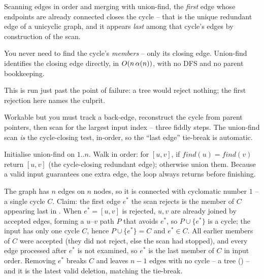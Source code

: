 \begin{observation}
Scanning edges in order and merging with union-find, the \emph{first} edge whose endpoints are
already connected closes the cycle -- that is the unique redundant edge of a unicyclic graph, and it
appears \emph{last} among that cycle's edges by construction of the scan.
\end{observation}
\begin{observation}
You never need to find the cycle's \emph{members} -- only its closing edge. Union-find identifies the
closing edge directly, in $O(n\,\alpha(n))$, with no DFS and no parent bookkeeping.
\end{observation}
\begin{observation}
This is  run just past the point of failure: a tree would reject nothing; the first
rejection here names the culprit.
\end{observation}

\begin{thinkbox}
{Workable but you must track a back-edge, reconstruct the cycle from parent pointers, then scan for
the largest input index -- three fiddly steps. The union-find scan \emph{is} the cycle-closing test,
in-order, so the ``last edge'' tie-break is automatic.}
\end{thinkbox}

Initialise union-find on $1..n$. Walk  in order: for $[u,v]$, if $\mathit{find}(u)=\mathit{find}(v)$
return $[u,v]$ (the cycle-closing redundant edge); otherwise union them. Because a valid input
guarantees one extra edge, the loop always returns before finishing.

\begin{proofbox}
The graph has $n$ edges on $n$ nodes, so it is connected with cyclomatic number $1$ -- a single
cycle $C$. Claim: the first edge $e^\ast$ the scan rejects is the member of $C$ appearing last in
. When $e^\ast=[u,v]$ is rejected, $u,v$ are already joined by accepted edges, forming a
$u$--$v$ path $P$ that avoids $e^\ast$, so $P\cup\{e^\ast\}$ is a cycle; the input has only one cycle
$C$, hence $P\cup\{e^\ast\}=C$ and $e^\ast\in C$. All earlier members of $C$ were accepted (they did
not reject, else the scan had stopped), and every edge processed after $e^\ast$ is not examined, so
$e^\ast$ is the last member of $C$ in input order. Removing $e^\ast$ breaks $C$ and leaves $n-1$
edges with no cycle -- a tree () -- and it is the latest valid deletion, matching
the tie-break. \end{proofbox}

